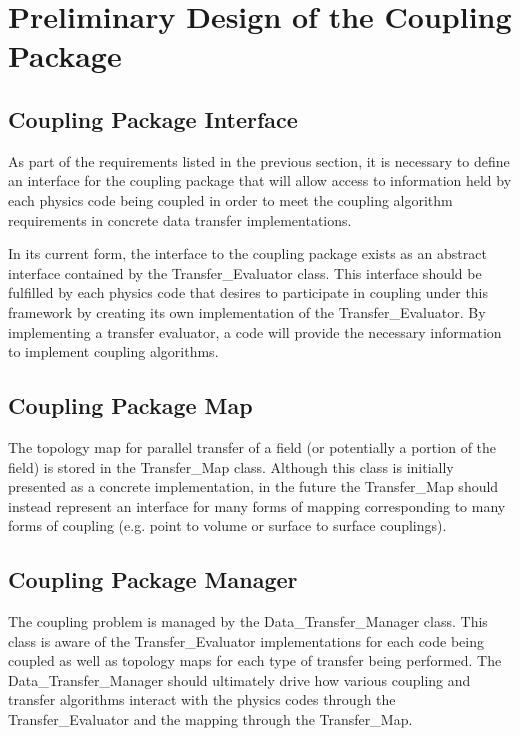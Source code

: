 \documentclass[letterpaper]{article}
\begin{document}
\section{Preliminary Design of the Coupling Package}

\subsection{Coupling Package Interface}
As part of the requirements listed in the previous section, it is
necessary to define an interface for the coupling package that will
allow access to information held by each physics code being coupled in
order to meet the coupling algorithm requirements in concrete data
transfer implementations.

In its current form, the interface to the coupling package exists as
an abstract interface contained by the Transfer\_Evaluator class. This
interface should be fulfilled by each physics code that desires to
participate in coupling under this framework by creating its own
implementation of the Transfer\_Evaluator. By implementing a transfer
evaluator, a code will provide the necessary information to implement
coupling algorithms.

\subsection{Coupling Package Map}
The topology map for parallel transfer of a field (or potentially a
portion of the field) is stored in the Transfer\_Map class. Although
this class is initially presented as a concrete implementation, in the
future the Transfer\_Map should instead represent an interface for
many forms of mapping corresponding to many forms of coupling
(e.g. point to volume or surface to surface couplings).

\subsection{Coupling Package Manager}
The coupling problem is managed by the Data\_Transfer\_Manager
class. This class is aware of the Transfer\_Evaluator implementations
for each code being coupled as well as topology maps for each type of 
transfer being performed. The Data\_Transfer\_Manager should
ultimately drive how various coupling and transfer algorithms interact
with the physics codes through the Transfer\_Evaluator and the mapping
through the Transfer\_Map. 
\end{document}
